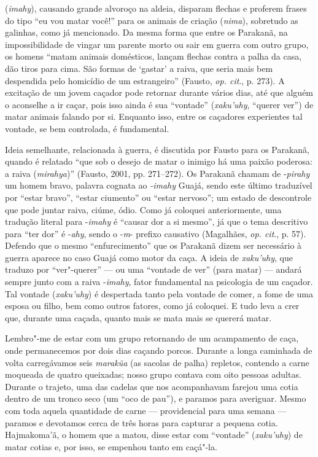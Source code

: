 (\emph{imahy}), causando grande alvoroço na aldeia, disparam flechas e
proferem frases do tipo ``eu vou matar você!'' para os animais de criação
(\emph{nima}), sobretudo as galinhas, como já mencionado. Da mesma forma
que entre os Parakanã, na impossibilidade de vingar um parente morto ou
sair em guerra com outro grupo, os homens ``matam animais domésticos,
lançam flechas contra a palha da casa, dão tiros para cima. São formas
de `gastar' a raiva, que seria mais bem despendida pelo homicídio de um
estrangeiro'' (Fausto, \emph{op. cit}., p. 273). A excitação de um jovem caçador
pode retornar durante vários dias, até que alguém o aconselhe a ir
caçar, pois isso ainda é sua ``vontade'' (\emph{xaku'uhy}, ``querer ver'')
de matar animais falando por si. Enquanto isso, entre os caçadores
experientes tal vontade, se bem controlada, é fundamental.

Ideia semelhante, relacionada à guerra, é discutida por Fausto para os
Parakanã, quando é relatado ``que sob o desejo de matar o inimigo há uma
paixão poderosa: a raiva (\emph{mirahya})'' (Fausto, 2001, pp. 271--272).
Os Parakanã chamam de -\emph{pirahy} um homem bravo, palavra cognata ao
\emph{-imahy} Guajá, sendo este último traduzível por ``estar bravo'',
``estar ciumento'' ou ``estar nervoso''; um estado de descontrole que pode
juntar raiva, ciúme, ódio. Como já coloquei anteriormente, uma tradução
literal para -\emph{imahy} é ``causar dor a si mesmo'', já que o tema
descritivo para ``ter dor'' é -\emph{ahy}, sendo o -\emph{m}- prefixo
causativo (Magalhães, \emph{op. cit}., p. 57). Defendo que o mesmo
``enfurecimento'' que os Parakanã dizem ser necessário à guerra aparece no
caso Guajá como motor da caça. A ideia de \emph{xaku'uhy}, que traduzo
por ``ver"-querer'' --- ou uma ``vontade de ver'' (para matar) --- andará sempre
junto com a raiva -\emph{imahy}, fator fundamental na psicologia de um
caçador. Tal vontade (\emph{xaku'uhy}) é despertada tanto pela vontade
de comer, a fome de uma esposa ou filho, bem como outros fatores, como
já coloquei. E tudo leva a crer que, durante uma caçada, quanto mais se
mata mais se quererá matar.

Lembro"-me de estar com um grupo retornando de um acampamento de caça,
onde permanecemos por dois dias caçando porcos. Durante a longa
caminhada de volta carregávamos seis \emph{marakũa} (as sacolas de
palha) repletos, contendo a carne moqueada de quatro queixadas; nosso
grupo contava com oito pessoas adultas. Durante o trajeto, uma das
cadelas que nos acompanhavam farejou uma cotia dentro de um tronco seco
(um ``oco de pau''), e paramos para averiguar. Mesmo com toda aquela
quantidade de carne --- providencial para uma semana --- paramos e devotamos
cerca de três horas para capturar a pequena cotia. Hajmakoma'ã, o homem
que a matou, disse estar com ``vontade'' (\emph{xaku'uhy}) de matar cotias
e, por isso, se empenhou tanto em caçá"-la.

